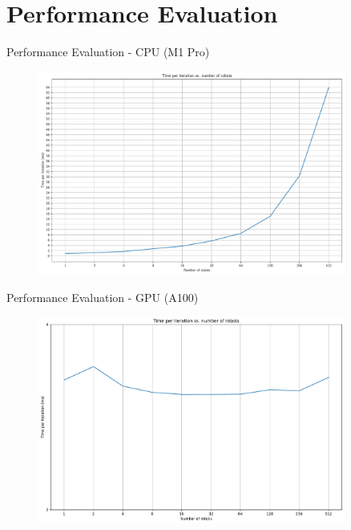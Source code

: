 \documentclass[12pt]{beamer}
\begin{document}
\section{Performance Evaluation}
\begin{frame}{Performance Evaluation - CPU (M1 Pro)}
  \begin{figure}[H]
    \centering
    \includegraphics[width=0.9\textwidth]{fig/benchmark_cpu_m1.pdf}
    \label{fig:cpu_speedup}
  \end{figure}
\end{frame}

\begin{frame}{Performance Evaluation - GPU (A100)}
  \begin{figure}[H]
    \centering
    \includegraphics[width=0.9\textwidth]{fig/benchmark_cuda_2025-01-12_21-41-37_eager.pdf}
    \label{fig:gpu_speedup}
  \end{figure}
\end{frame}

\end{document}
